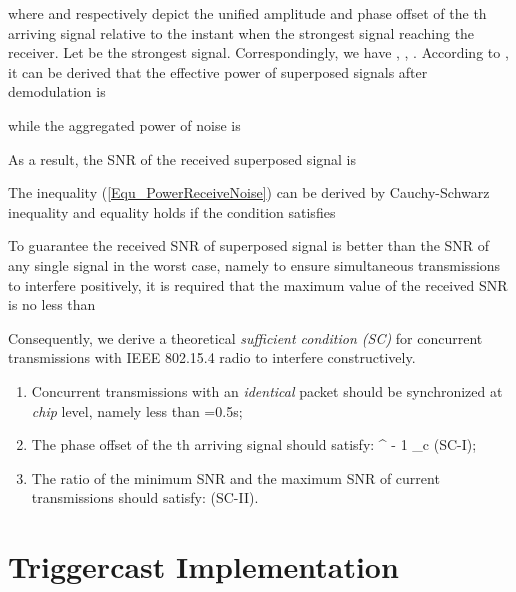\documentclass[conference]{IEEEtran}
\begin{document}
where  and  respectively depict the unified amplitude and phase offset of the th arriving signal relative to the instant when the strongest signal reaching the receiver. Let  be the strongest signal. Correspondingly, we have , , .
According to \cite{Yin2012SCIF}, it can be derived that the effective power  of superposed signals after demodulation is

while the aggregated power of noise  is

As a result, the SNR of the received superposed signal is

The inequality (\ref{Equ_PowerReceiveNoise}) can be derived by Cauchy-Schwarz inequality and equality holds if the condition satisfies

To guarantee the received SNR of superposed signal is better than the SNR of any single signal in the worst case, namely to ensure simultaneous transmissions to interfere positively, it is required that the maximum value of the received SNR is no less than 

Consequently, we derive a theoretical \emph{sufficient condition (SC)} for concurrent transmissions with IEEE 802.15.4 radio to interfere constructively.
\begin{enumerate}
\setlength{\itemsep}{-0.245ex}
\item
Concurrent transmissions with an \emph{identical} packet should be synchronized at \emph{chip} level, namely less than =0.5s;
\item
The phase offset of the th arriving signal should satisfy: {\cos ^{ - 1} }{\omega _c } (SC-I);
\item
The ratio of the minimum SNR  and the maximum SNR  of current transmissions should satisfy:
 (SC-II).
\end{enumerate}
\section{Triggercast Implementation}
\end{document}
